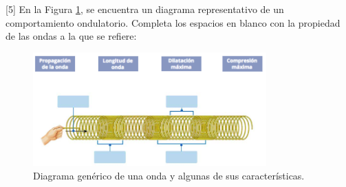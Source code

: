 [5] En la Figura \ref{fig:onda_resorte}, se encuentra un diagrama representativo de un comportamiento ondulatorio. Completa los espacios en blanco con la propiedad de las ondas a la que se refiere:
\begin{figure}[H]
    \centering
    \includegraphics[width =0.8\textwidth ]{Images/onda_resorte.png}
    \caption{Diagrama gen\'erico de una onda y algunas de sus caracter\'isticas.}
    \label{fig:onda_resorte}
\end{figure}
